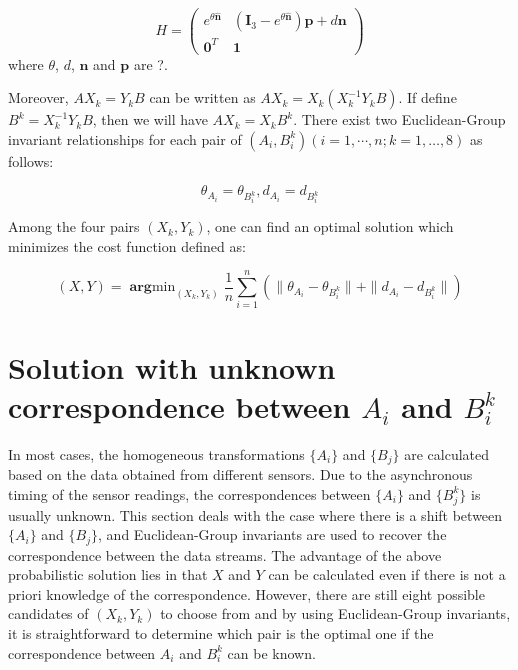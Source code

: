 \documentclass[letterpaper, 10 pt, conference]{ieeeconf}  %
\begin{document}
\begin{equation}\label{equ21}
H = \left( \begin{array}{cc}
       e^{\theta \hat{\mathbf{n}}} & (\mathbf{I}_{3} - e^{\theta \hat{\mathbf{n}}})\mathbf{p} + d\mathbf{n} \\
       \mathbf{0}^{T} & \mathbf{1}
\end{array} \right)
\end{equation}
where $\theta$, $d$, $\mathbf{n}$ and $\mathbf{p}$ are ?.

Moreover, $AX_k = Y_k B$ can be written as $AX_k=X_k(X_k^{-1}Y_kB)$. If define $B^k = X_k^{-1}Y_kB$, then we will have $AX_k=X_kB^k$. There exist two Euclidean-Group invariant relationships for each pair of $(A_{i},B_{i}^k)( i = 1,\cdots,n; k=1,\dots,8)$ as follows:

\begin{equation}\label{equ22}
    \theta_{A_{i}}=\theta_{B_{i}^{k}}, d_{A_{i}}=d_{B_{i}^{k}}
\end{equation}

Among the four pairs $(X_{k},Y_{k})$, one can find an optimal solution which  minimizes the cost function defined as:

\begin{equation}\label{equ23}
    (X,Y) = \mathop{\mathbf{arg}min}_{(X_{k},Y_{k})}\frac{1}{n} \sum_{i=1}^{n} (\parallel \theta_{A_{i}}-\theta_{B_{i}^{k}} \parallel + \parallel d_{A_{i}}-d_{B_{i}^{k}} \parallel)
\end{equation}

\section{Solution with unknown correspondence between $A_{i}$ and $B_{i}^{k}$}
\label{sect3}

In most cases, the homogeneous transformations  $\{A_i\}$ and $\{B_j\}$ are calculated based on the data obtained from different sensors. Due to the asynchronous timing of the sensor readings, the correspondences between $\{A_{i}\}$ and $\{B_{j}^{k}\}$ is usually unknown. This section deals with the case where there is a shift between $\{A_i\}$ and $\{B_j\}$, and Euclidean-Group invariants are used to recover the correspondence between the data streams. {\color{red}The advantage of the above probabilistic solution lies in that $X$ and $Y$ can be calculated even if there is not a priori knowledge of the correspondence.} However, there are still eight possible candidates of $(X_{k},Y_{k})$ to choose from and by using Euclidean-Group invariants, it is straightforward to determine which pair is the optimal one if the correspondence between $A_{i}$ and $B_{i}^{k}$ can be known.
\end{document}
